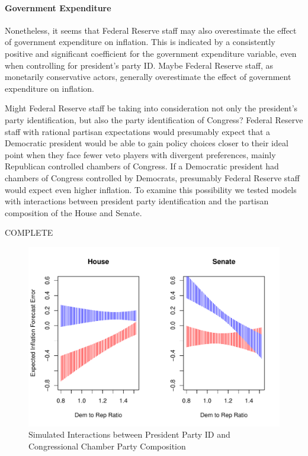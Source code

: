 \documentclass[a4paper]{article}\usepackage{graphicx, color}
\newenvironment{knitrout}{}{} %
\begin{document}
\paragraph{Government Expenditure}

Nonetheless, it seems that Federal Reserve staff may also overestimate the effect of government expenditure on inflation. This is indicated by a consistently positive and significant coefficient for the government expenditure variable, even when controlling for president's party ID. Maybe Federal Reserve staff, as monetarily conservative actors, generally overestimate the effect of government expenditure on inflation.

Might Federal Reserve staff be taking into consideration not only the president's party identification, but also the party identification of Congress? Federal Reserve staff with rational partisan expectations would presumably expect that a Democratic president would be able to gain policy choices closer to their ideal point when they face fewer veto players with divergent preferences, mainly Republican controlled chambers of Congress. If a Democratic president had chambers of Congress controlled by Democrats, presumably Federal Reserve staff would expect even higher inflation. To examine this possibility we tested models with interactions between president party identification and the partisan composition of the House and Senate.

COMPLETE

\begin{figure}[t]
    \caption{Simulated Interactions between President Party ID and Congressional Chamber Party Composition}
    \label{InteractionPlots}
    \begin{center}

\begin{knitrout}
\color{fgcolor}\includegraphics[width=0.95\linewidth]{figure/InterPlots} 
\end{knitrout}


    \end{center}
\end{figure}
\end{document}
